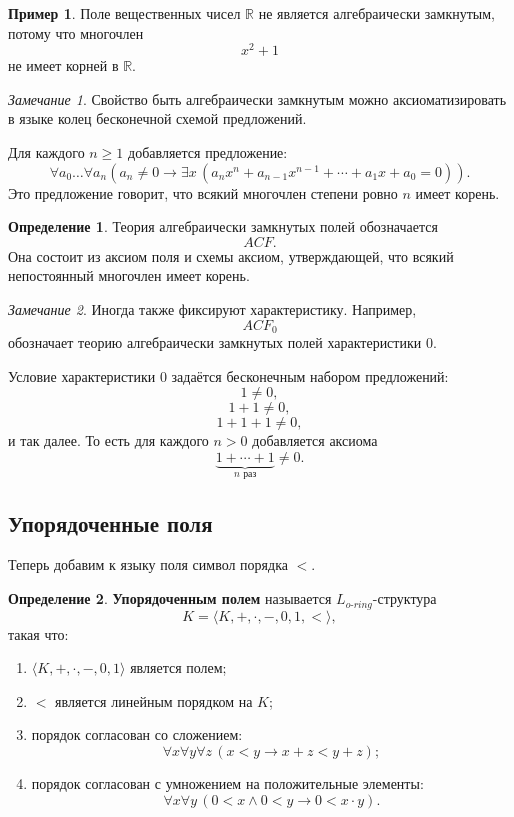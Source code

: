 \documentclass[12pt,a4paper,oneside,openany]{book}
\theoremstyle{definition}
\newtheorem{definition}{Определение}[chapter]
\newtheorem{example}{Пример}[chapter]
\theoremstyle{plain}
\theoremstyle{remark}
\newtheorem{remark}{Замечание}[chapter]
\begin{document}
\begin{example}
Поле вещественных чисел $\mathbb R$ не является алгебраически замкнутым, потому что многочлен
\[
x^2+1
\]
не имеет корней в $\mathbb R$.
\end{example}

\begin{remark}
Свойство быть алгебраически замкнутым можно аксиоматизировать в языке колец бесконечной схемой предложений.

Для каждого $n\ge 1$ добавляется предложение:
\[
\forall a_0\ldots \forall a_n
\left(
a_n\ne 0
\to
\exists x\,
(a_nx^n+a_{n-1}x^{n-1}+\cdots+a_1x+a_0=0)
\right).
\]
Это предложение говорит, что всякий многочлен степени ровно $n$ имеет корень.
\end{remark}

\begin{definition}
Теория алгебраически замкнутых полей обозначается
\[
ACF.
\]
Она состоит из аксиом поля и схемы аксиом, утверждающей, что всякий непостоянный многочлен имеет корень.
\end{definition}

\begin{remark}
Иногда также фиксируют характеристику. Например,
\[
ACF_0
\]
обозначает теорию алгебраически замкнутых полей характеристики $0$.

Условие характеристики $0$ задаётся бесконечным набором предложений:
\[
1\ne 0,
\]
\[
1+1\ne 0,
\]
\[
1+1+1\ne 0,
\]
и так далее. То есть для каждого $n>0$ добавляется аксиома
\[
\underbrace{1+\cdots+1}_{n\text{ раз}}\ne 0.
\]
\end{remark}

\subsection{Упорядоченные поля}

Теперь добавим к языку поля символ порядка $<$.

\begin{definition}
\textbf{Упорядоченным полем} называется $L_{o\text{-}ring}$-структура
\[
K=\langle K,+,\cdot,-,0,1,<\rangle,
\]
такая что:
\begin{enumerate}
    \item $\langle K,+,\cdot,-,0,1\rangle$ является полем;
    \item $<$ является линейным порядком на $K$;
    \item порядок согласован со сложением:
    \[
    \forall x\forall y\forall z\,
    (x<y\to x+z<y+z);
    \]
    \item порядок согласован с умножением на положительные элементы:
    \[
    \forall x\forall y\,
    (0<x\wedge 0<y\to 0<x\cdot y).
    \]
\end{enumerate}
\end{definition}
\end{document}
